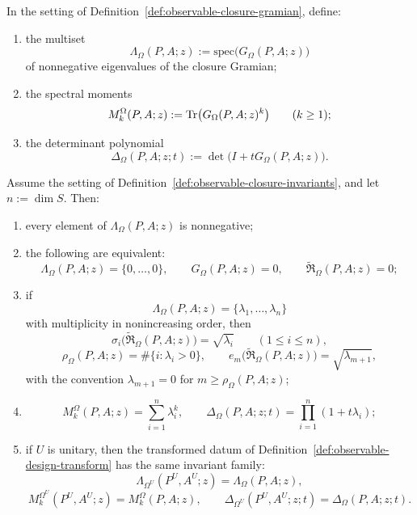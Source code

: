 \begin{definition}
\label{def:observable-closure-invariants}
In the setting of Definition~\ref{def:observable-closure-gramian}, define:
\begin{enumerate}[label=(\roman*), itemsep=0.2em]
\item the multiset
      \[
      \Lambda_{\Omega}(P,A;z):=
      \mathrm{spec}\bigl(G_{\Omega}(P,A;z)\bigr)
      \]
      of nonnegative eigenvalues of the closure Gramian;
\item the spectral moments
      \[
      M_k^{\Omega}(P,A;z):=
      \mathrm{Tr}\bigl(G_{\Omega}(P,A;z)^k\bigr)
      \qquad (k\ge 1);
      \]
\item the determinant polynomial
      \[
      \Delta_{\Omega}(P,A;z;t):=
      \det\bigl(I+tG_{\Omega}(P,A;z)\bigr).
      \]
\end{enumerate}
\end{definition}

\begin{theorem}
\label{thm:observable-closure-invariant-package}
Assume the setting of Definition~\ref{def:observable-closure-invariants}, and
let \(n:=\dim S\). Then:
\begin{enumerate}[label=(\roman*), itemsep=0.2em]
\item every element of \(\Lambda_{\Omega}(P,A;z)\) is nonnegative;
\item the following are equivalent:
      \[
      \Lambda_{\Omega}(P,A;z)=\{0,\dots,0\},
      \qquad
      G_{\Omega}(P,A;z)=0,
      \qquad
      \widetilde{\mathfrak R}_{\Omega}(P,A;z)=0;
      \]
\item if
      \[
      \Lambda_{\Omega}(P,A;z)=\{\lambda_1,\dots,\lambda_n\}
      \]
      with multiplicity in nonincreasing order, then
      \[
      \sigma_i\!\bigl(\widetilde{\mathfrak R}_{\Omega}(P,A;z)\bigr)
      =
      \sqrt{\lambda_i}
      \qquad (1\le i\le n),
      \]
      \[
      \rho_{\Omega}(P,A;z)=\#\{i:\lambda_i>0\},
      \qquad
      e_m\!\bigl(\widetilde{\mathfrak R}_{\Omega}(P,A;z)\bigr)
      =
      \sqrt{\lambda_{m+1}},
      \]
      with the convention \(\lambda_{m+1}=0\) for \(m\ge \rho_{\Omega}(P,A;z)\);
\item
      \[
      M_k^{\Omega}(P,A;z)=\sum_{i=1}^{n}\lambda_i^k,
      \qquad
      \Delta_{\Omega}(P,A;z;t)=\prod_{i=1}^{n}(1+t\lambda_i);
      \]
\item if \(U\) is unitary, then the transformed datum of
      Definition~\ref{def:observable-design-transform} has the same invariant
      family:
      \[
      \Lambda_{\Omega^U}(P^U,A^U;z)=\Lambda_{\Omega}(P,A;z),
      \]
      \[
      M_k^{\Omega^U}(P^U,A^U;z)=M_k^{\Omega}(P,A;z),
      \qquad
      \Delta_{\Omega^U}(P^U,A^U;z;t)=\Delta_{\Omega}(P,A;z;t).
      \]
\end{enumerate}
\end{theorem}

